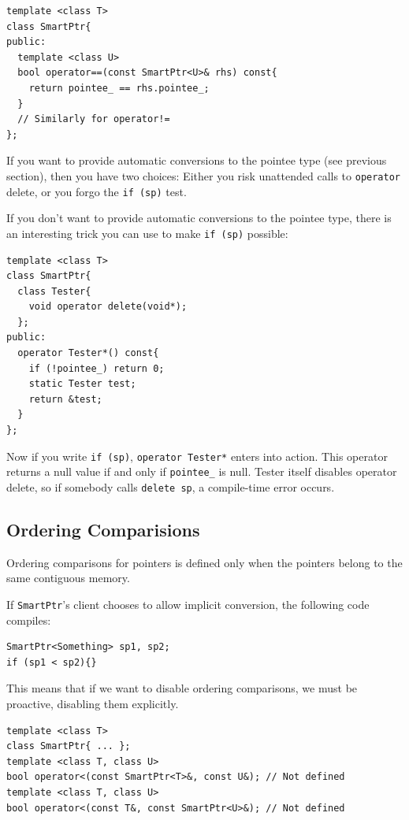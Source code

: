 \begin{verbatim}
template <class T>
class SmartPtr{
public:
  template <class U>
  bool operator==(const SmartPtr<U>& rhs) const{
    return pointee_ == rhs.pointee_;
  }
  // Similarly for operator!=
};
\end{verbatim}

If you want to provide automatic conversions to the pointee type (see
previous section), then you have two choices: Either you risk
unattended calls to \texttt{operator} delete, or you forgo the
\texttt{if (sp)} test.

If you don't want to provide automatic conversions to the pointee
type, there is an interesting trick you can use to make \texttt{if
  (sp)} possible:
\begin{verbatim}
template <class T>
class SmartPtr{
  class Tester{
    void operator delete(void*);
  };
public:
  operator Tester*() const{
    if (!pointee_) return 0;
    static Tester test;
    return &test;
  }
};
\end{verbatim}

Now if you write \texttt{if (sp)}, \texttt{operator Tester*} enters
into action. This operator returns a null value if and only if
\texttt{pointee\_} is null. Tester itself disables operator delete, so
if somebody calls \texttt{delete sp}, a compile-time error occurs.

\subsection{Ordering Comparisions}

Ordering comparisons for pointers is defined only when the pointers
belong to the same contiguous memory.

 If \texttt{SmartPtr}'s client chooses to allow implicit conversion,
 the following code compiles: 
\begin{verbatim}
SmartPtr<Something> sp1, sp2;
if (sp1 < sp2){}
\end{verbatim}

 This means that if we want to disable ordering comparisons, we must
 be proactive, disabling them explicitly.

\begin{verbatim}
template <class T>
class SmartPtr{ ... };
template <class T, class U>
bool operator<(const SmartPtr<T>&, const U&); // Not defined
template <class T, class U>
bool operator<(const T&, const SmartPtr<U>&); // Not defined
\end{verbatim}

